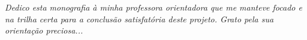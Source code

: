 \begin{dedicatoria}
	\vspace*{\fill}
	\centering
	\noindent
	\textit{Dedico esta monografia  à minha professora orientadora que me manteve focado e na trilha certa para a conclusão satisfatória deste projeto. Grato pela sua orientação preciosa...}
	\vspace*{\fill}
\end{dedicatoria}